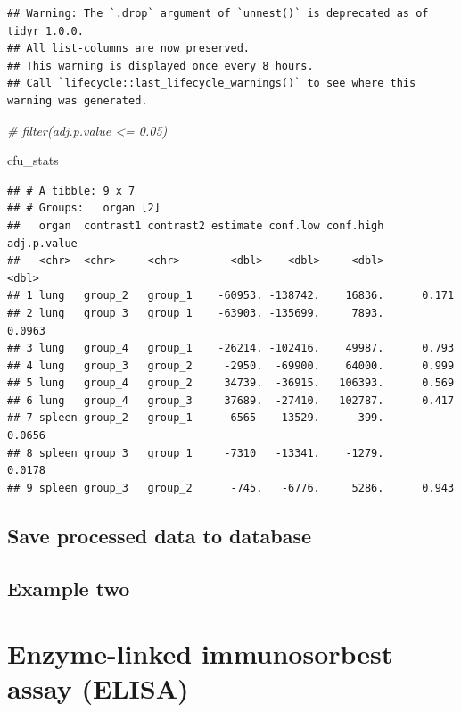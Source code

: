 \documentclass[
]{book}
\newenvironment{Shaded}{\begin{snugshade}}{\end{snugshade}}
\newcommand{\CommentTok}[1]{\textcolor[rgb]{0.56,0.35,0.01}{\textit{#1}}}
\newcommand{\NormalTok}[1]{#1}
\begin{document}
\begin{verbatim}
## Warning: The `.drop` argument of `unnest()` is deprecated as of tidyr 1.0.0.
## All list-columns are now preserved.
## This warning is displayed once every 8 hours.
## Call `lifecycle::last_lifecycle_warnings()` to see where this warning was generated.
\end{verbatim}

\begin{Shaded}
\begin{Highlighting}[]
  \CommentTok{\# filter(adj.p.value \textless{}= 0.05)}

\NormalTok{cfu\_stats}
\end{Highlighting}
\end{Shaded}

\begin{verbatim}
## # A tibble: 9 x 7
## # Groups:   organ [2]
##   organ  contrast1 contrast2 estimate conf.low conf.high adj.p.value
##   <chr>  <chr>     <chr>        <dbl>    <dbl>     <dbl>       <dbl>
## 1 lung   group_2   group_1    -60953. -138742.    16836.      0.171 
## 2 lung   group_3   group_1    -63903. -135699.     7893.      0.0963
## 3 lung   group_4   group_1    -26214. -102416.    49987.      0.793 
## 4 lung   group_3   group_2     -2950.  -69900.    64000.      0.999 
## 5 lung   group_4   group_2     34739.  -36915.   106393.      0.569 
## 6 lung   group_4   group_3     37689.  -27410.   102787.      0.417 
## 7 spleen group_2   group_1     -6565   -13529.      399.      0.0656
## 8 spleen group_3   group_1     -7310   -13341.    -1279.      0.0178
## 9 spleen group_3   group_2      -745.   -6776.     5286.      0.943
\end{verbatim}

\hypertarget{save-processed-data-to-database}{%
\section{Save processed data to database}\label{save-processed-data-to-database}}

\hypertarget{example-two}{%
\section{Example two}\label{example-two}}

\hypertarget{enzyme-linked-immunosorbest-assay-elisa}{%
\chapter{Enzyme-linked immunosorbest assay (ELISA)}\label{enzyme-linked-immunosorbest-assay-elisa}}
\end{document}
